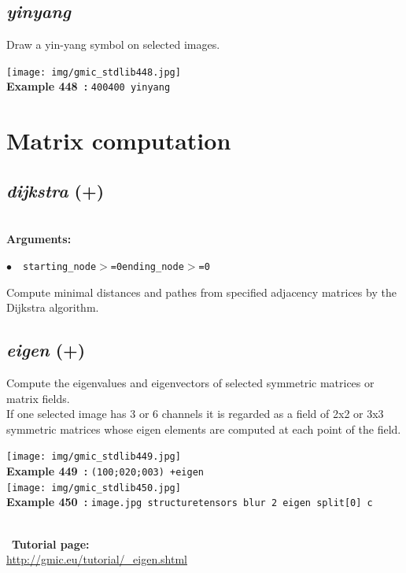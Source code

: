 \documentclass[a4paper,10.5pt,twoside]{book}
\def\comma{\discretionary{,}{}{,}}
\newcommand{\Cb}[1]{\textcolor{cb}{#1}}
\begin{document}
\subsection{\emph{yinyang} }\vspace*{-0.7em}
Draw a yin-yang symbol on selected images.
\begin{center}\texttt{[image: img/gmic\_stdlib448.jpg]}\\
{\footnotesize \textbf{Example 448~:} \texttt{400{\comma}400 yinyang}}
\end{center}
\section{Matrix computation}


\subsection{\emph{dijkstra} (+)}\vspace*{-0.7em}
~\\\textbf{\Cb{Arguments: }}\begin{flushleft}
{\small \Cb{\hspace*{0.5cm}$\bullet$~~\texttt{starting\_node$>$=0{\comma}ending\_node$>$=0}}}\end{flushleft}
Compute minimal distances and pathes from specified adjacency matrices by the Dijkstra algorithm.


\subsection{\emph{eigen} (+)}\vspace*{-0.7em}
Compute the eigenvalues and eigenvectors of selected symmetric matrices or matrix fields.
~\\If one selected image has 3 or 6 channels{\comma} it is regarded as a field of 2x2 or 3x3 symmetric matrices{\comma}
whose eigen elements are computed at each point of the field.
\begin{center}\texttt{[image: img/gmic\_stdlib449.jpg]}\\
{\footnotesize \textbf{Example 449~:} \texttt{(1{\comma}0{\comma}0;0{\comma}2{\comma}0;0{\comma}0{\comma}3) +eigen}}
\\\texttt{[image: img/gmic\_stdlib450.jpg]}\\
{\footnotesize \textbf{Example 450~:} \texttt{image.jpg structuretensors blur 2 eigen split[0] c}}
\end{center}
~\\
~\textbf{Tutorial page: }\\\url{http://gmic.eu/tutorial/\_eigen.shtml}
\end{document}
